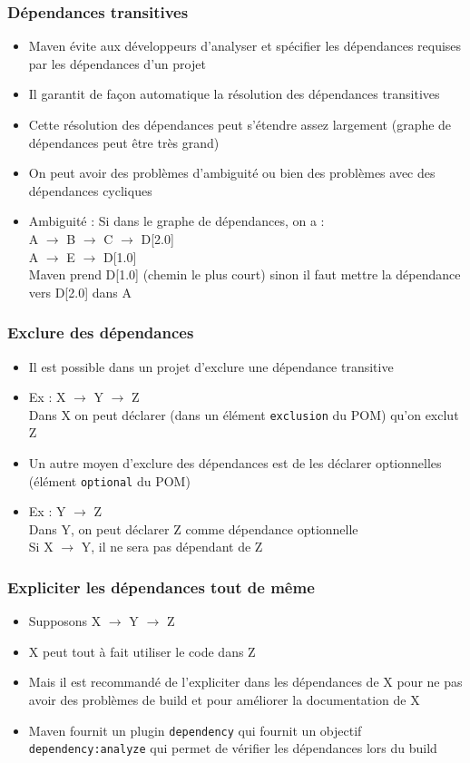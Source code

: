 \documentclass{beamer}
\begin{document}
\begin{frame}[fragile]
  \frametitle{Dépendances transitives}
  \begin{itemize}
  \item Maven évite aux développeurs d'analyser et spécifier les
    dépendances requises par les dépendances d'un projet
  \item Il garantit de façon automatique la résolution des dépendances transitives
  \item Cette résolution des dépendances peut s'étendre assez
    largement (graphe de dépendances peut être très grand)
  \item On peut avoir des problèmes d'ambiguité ou bien des problèmes
    avec des dépendances cycliques
  \item Ambiguité : Si dans le graphe de dépendances, on a :\\
    A $\rightarrow$ B $\rightarrow$ C $\rightarrow$ D[2.0]\\
    A $\rightarrow$ E $\rightarrow$ D[1.0]\\
    Maven prend D[1.0] (chemin le plus court) sinon il faut mettre la
    dépendance vers D[2.0] dans A
  \end{itemize}
\end{frame}

\begin{frame}[fragile]
  \frametitle{Exclure des dépendances}
  \begin{itemize}
  \item Il est possible dans un projet d'exclure une dépendance
    transitive
  \item Ex : X $\rightarrow$ Y $\rightarrow$ Z\\
    Dans X on peut déclarer (dans un élément \texttt{exclusion} du
    POM) qu'on exclut Z
  \item Un autre moyen d'exclure des dépendances est de les déclarer
    optionnelles (élément \texttt{optional} du POM)
  \item Ex : Y $\rightarrow$ Z\\
    Dans Y, on peut déclarer Z comme dépendance optionnelle\\
    Si X $\rightarrow$ Y, il ne sera pas dépendant de Z\\
  \end{itemize}
\end{frame}

\begin{frame}[fragile]
  \frametitle{Expliciter les dépendances tout de même}
  \begin{itemize}
  \item Supposons X $\rightarrow$ Y $\rightarrow$ Z
  \item X peut tout à fait utiliser le code dans Z
  \item Mais il est recommandé de l'expliciter dans les dépendances de
    X pour ne pas avoir des problèmes de build et pour améliorer la
    documentation de X
  \item Maven fournit un plugin \texttt{dependency} qui fournit un
    objectif \texttt{dependency:analyze} qui permet de vérifier les
    dépendances lors du build
  \end{itemize}
\end{frame}
\end{document}
